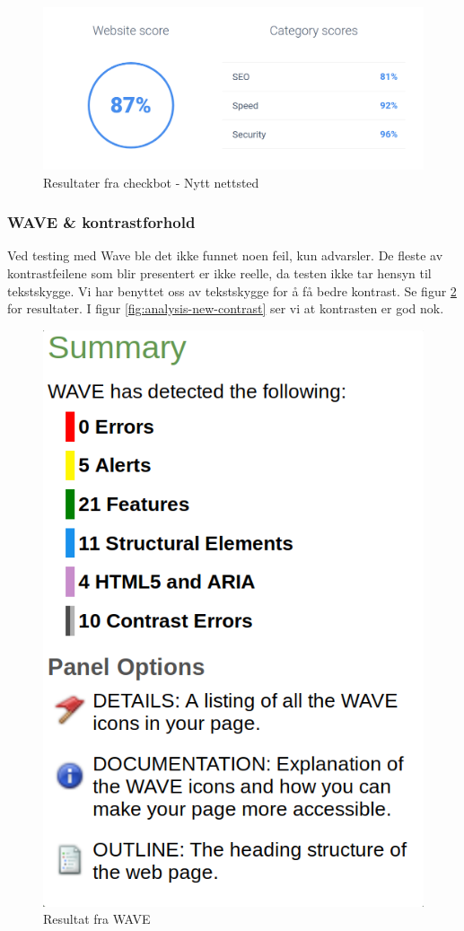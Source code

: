 \begin{figure}[H]
    \centering
    \includegraphics[width=\textwidth]{bjornar/checkbotio-summary-new.png}
    \caption{Resultater fra checkbot - Nytt nettsted}
    \label{fig:analysis-new-checkbot-summary}
\end{figure}


\subsubsection{WAVE \& kontrastforhold}
Ved testing med Wave ble det ikke funnet noen feil, kun advarsler. De fleste av kontrastfeilene som blir presentert er ikke reelle, da testen ikke tar hensyn til tekstskygge. Vi har benyttet oss av tekstskygge for å få bedre kontrast. Se figur \ref{fig:analysis-new-wave-summary} for resultater. I figur \ref{fig:analysis-new-contrast} ser vi at kontrasten er god nok.

\begin{figure}[H]
    \centering
    \includegraphics[width=.3\textwidth]{bjornar/wave-new.png}
    \caption{Resultat fra WAVE}
    \label{fig:analysis-new-wave-summary}
\end{figure}

